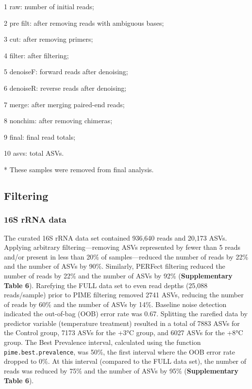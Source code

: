 \documentclass[
  10pt,
  letterpaper,
  DIV=11,
  numbers=noendperiod]{scrartcl}
\begin{document}
\begin{table}[H]
\begin{threeparttable}
\begin{tablenotes}[para]
\item 
\item[1] raw: number of initial reads; 
\item[2] pre filt: after removing reads with ambiguous bases; 
\item[3] cut:  after removing primers; 
\item[4] filter:  after filtering; 
\item[5] denoiseF: forward reads after denoising; 
\item[6] denoiseR: reverse reads after denoising; 
\item[7] merge:  after merging paired-end reads; 
\item[8] nonchim:  after removing chimeras; 
\item[9] final: final read totals; 
\item[10] asvs: total ASVs. 
\item[*] These samples were removed from final analysis. 
\end{tablenotes}
\end{threeparttable}
\end{table}

\hypertarget{filtering-1}{%
\subsection{Filtering}\label{filtering-1}}

\hypertarget{s-rrna-data-1}{%
\subsubsection{16S rRNA data}\label{s-rrna-data-1}}

The curated 16S rRNA data set contained 936,640 reads and 20,173 ASVs.
Applying arbitrary filtering---removing ASVs represented by fewer than 5
reads and/or present in less than 20\% of samples---reduced the number
of reads by 22\% and the number of ASVs by 90\%. Similarly, PERFect
filtering reduced the number of reads by 22\% and the number of ASVs by
92\% (\textbf{Supplementary Table 6}). Rarefying the FULL data set to
even read depths (25,088 reads/sample) prior to PIME filtering removed
2741 ASVs, reducing the number of reads by 60\% and the number of ASVs
by 14\%. Baseline noise detection indicated the out-of-bag (OOB) error
rate was 0.67. Splitting the rarefied data by predictor variable
(temperature treatment) resulted in a total of 7883 ASVs for the Control
group, 7173 ASVs for the +3°C group, and 6027 ASVs for the +8°C group.
The Best Prevalence interval, calculated using the function
\texttt{pime.best.prevalence}, was 50\%, the first interval where the
OOB error rate dropped to 0\%. At this interval (compared to the FULL
data set), the number of reads was reduced by 75\% and the number of
ASVs by 95\% (\textbf{Supplementary Table 6}).
\end{document}
